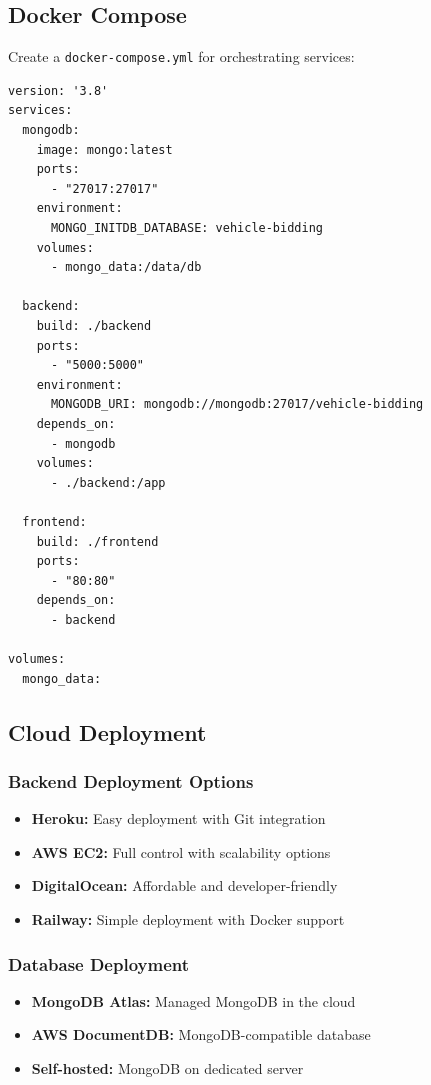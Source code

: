 \subsection{Docker Compose}

Create a \texttt{docker-compose.yml} for orchestrating services:

\begin{verbatim}
version: '3.8'
services:
  mongodb:
    image: mongo:latest
    ports:
      - "27017:27017"
    environment:
      MONGO_INITDB_DATABASE: vehicle-bidding
    volumes:
      - mongo_data:/data/db

  backend:
    build: ./backend
    ports:
      - "5000:5000"
    environment:
      MONGODB_URI: mongodb://mongodb:27017/vehicle-bidding
    depends_on:
      - mongodb
    volumes:
      - ./backend:/app

  frontend:
    build: ./frontend
    ports:
      - "80:80"
    depends_on:
      - backend

volumes:
  mongo_data:
\end{verbatim}

\subsection{Cloud Deployment}

\subsubsection{Backend Deployment Options}

\begin{itemize}
    \item \textbf{Heroku:} Easy deployment with Git integration
    \item \textbf{AWS EC2:} Full control with scalability options
    \item \textbf{DigitalOcean:} Affordable and developer-friendly
    \item \textbf{Railway:} Simple deployment with Docker support
\end{itemize}

\subsubsection{Database Deployment}

\begin{itemize}
    \item \textbf{MongoDB Atlas:} Managed MongoDB in the cloud
    \item \textbf{AWS DocumentDB:} MongoDB-compatible database
    \item \textbf{Self-hosted:} MongoDB on dedicated server
\end{itemize}


